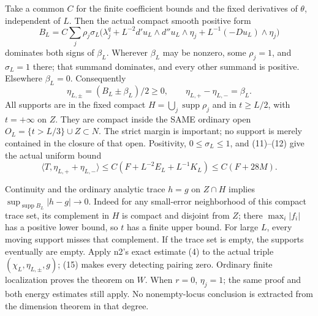 \documentclass[11pt]{article}
\begin{document}
Take a common \(C\) for the finite coefficient bounds and the fixed derivatives of \(\theta\), independent of \(L\). Then the actual compact smooth positive form
\[
 B_L=C\sum_j\rho_j\sigma_L
 \big(\lambda_j^q+L^{-2}d'u_L\wedge d''u_L\wedge\eta_j
               +L^{-1}(-Du_L)\wedge\eta_j\big)                            \tag{14}
\]
dominates both signs of \(\beta_L\). Wherever \(\beta_L\) may be nonzero, some \(\rho_j=1\), and \(\sigma_L=1\) there; that summand dominates, and every other summand is positive. Elsewhere \(\beta_L=0\). Consequently
\[
 \eta_{L,\pm}=(B_L\pm\beta_L)/2\geq0,\qquad
 \eta_{L,+}-\eta_{L,-}=\beta_L.
\]
All supports are in the fixed compact \(H=\bigcup_j\operatorname{supp}\rho_j\) and in \(t\geq L/2\), with \(t=+\infty\) on \(Z\). They are compact inside the SAME ordinary open \(O_L=\{t>L/3\}\cup Z\subset N\). The strict margin is important; no support is merely contained in the closure of that open. Positivity, \(0\leq\sigma_L\leq1\), and (11)--(12) give the actual uniform bound
\[
 \langle T,\eta_{L,+}+\eta_{L,-}\rangle
 \leq C(F+L^{-2}E_L+L^{-1}K_L)\leq C(F+28M).                             \tag{15}
\]

Continuity and the ordinary analytic trace \(h=g\) on \(Z\cap H\) implies \(\sup_{\operatorname{supp}B_L}|h-g|\to0\). Indeed for any small-error neighborhood of this compact trace set, its complement in \(H\) is compact and disjoint from \(Z\); there \(\max_i|f_i|\) has a positive lower bound, so \(t\) has a finite upper bound. For large \(L\), every moving support misses that complement. If the trace set is empty, the supports eventually are empty. Apply n2's exact estimate (4) to the actual triple \((\chi_L,\eta_{L,\pm},g)\); (15) makes every detecting pairing zero. Ordinary finite localization proves the theorem on \(W\). When \(r=0\), \(\eta_j=1\); the same proof and both energy estimates still apply. No nonempty-locus conclusion is extracted from the dimension theorem in that degree.
\end{document}
